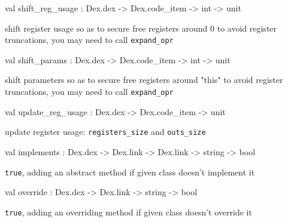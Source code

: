 \documentclass[11pt]{article}
\begin{document}
\label{val:Modify.shift-underscorereg-underscoreusage}\begin{ocamldoccode}
val shift_reg_usage : Dex.dex -> Dex.code_item -> int -> unit
\end{ocamldoccode}
\begin{ocamldocdescription}
shift register usage so as to secure free registers around 0
 to avoid register truncations, you may need to call {\tt{expand\_opr}}


\end{ocamldocdescription}




\label{val:Modify.shift-underscoreparams}\begin{ocamldoccode}
val shift_params : Dex.dex -> Dex.code_item -> int -> unit
\end{ocamldoccode}
\begin{ocamldocdescription}
shift parameters so as to secure free registers around "this"
 to avoid register truncations, you may need to call {\tt{expand\_opr}}


\end{ocamldocdescription}




\label{val:Modify.update-underscorereg-underscoreusage}\begin{ocamldoccode}
val update_reg_usage : Dex.dex -> Dex.code_item -> unit
\end{ocamldoccode}
\begin{ocamldocdescription}
update register usage: {\tt{registers\_size}} and {\tt{outs\_size}}


\end{ocamldocdescription}




\label{val:Modify.implements}\begin{ocamldoccode}
val implements : Dex.dex -> Dex.link -> Dex.link -> string -> bool
\end{ocamldoccode}
\begin{ocamldocdescription}
{\tt{true}}, adding an abstract method if given class doesn't implement it


\end{ocamldocdescription}




\label{val:Modify.override}\begin{ocamldoccode}
val override : Dex.dex -> Dex.link -> string -> bool
\end{ocamldoccode}
\begin{ocamldocdescription}
{\tt{true}}, adding an overriding method if given class doesn't override it


\end{ocamldocdescription}
\end{document}
